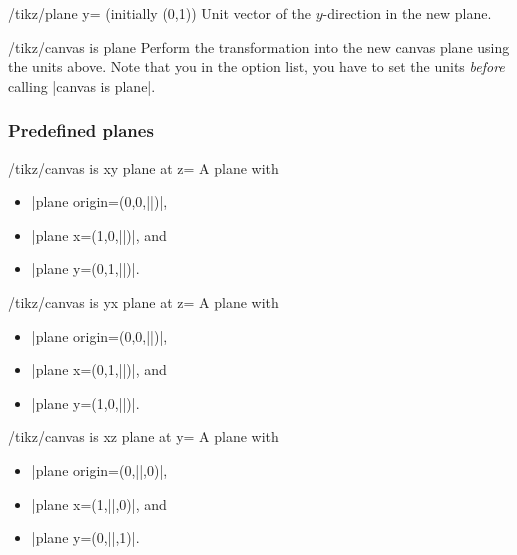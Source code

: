 \begin{key}{/tikz/plane y= (initially {(0,1)})}
  Unit vector of the $y$-direction in the new plane.
\end{key}

\begin{key}{/tikz/canvas is plane}
  Perform the transformation into the new canvas plane using the units
  above. Note that you in the option list, you have to set the units
  \emph{before} calling |canvas is plane|.
\begin{codeexample}[]
\end{codeexample}
\end{key}

\subsubsection{Predefined planes}

\begin{key}{/tikz/canvas is xy plane at z=}
  A plane with
  \begin{itemize}
  \item |plane origin={(0,0,||)}|,
  \item |plane x={(1,0,||)}|, and
  \item |plane y={(0,1,||)}|.
  \end{itemize}
\end{key}

\begin{key}{/tikz/canvas is yx plane at z=}
  A plane with
  \begin{itemize}
  \item |plane origin={(0,0,||)}|,
  \item |plane x={(0,1,||)}|, and
  \item |plane y={(1,0,||)}|.
  \end{itemize}
\end{key}

\begin{key}{/tikz/canvas is xz plane at y=}
  A plane with
  \begin{itemize}
  \item |plane origin={(0,||,0)}|,
  \item |plane x={(1,||,0)}|, and
  \item |plane y={(0,||,1)}|.
  \end{itemize}
\end{key}

